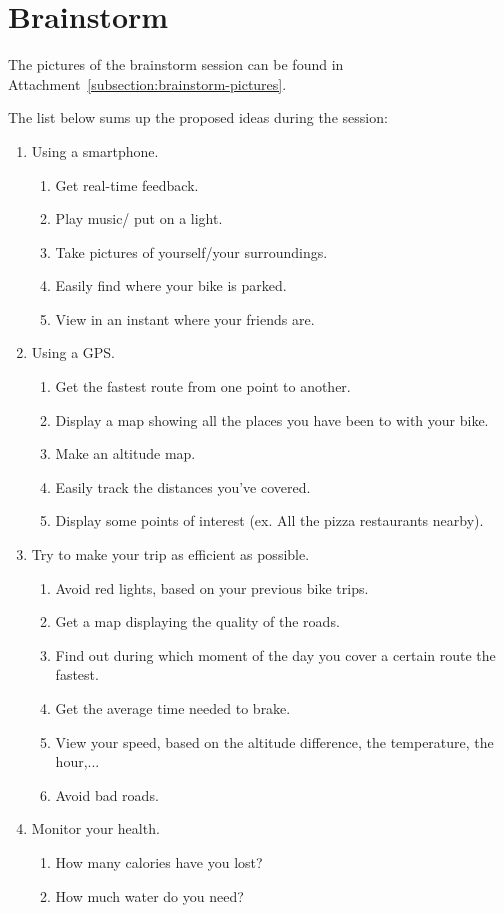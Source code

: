 \section{Brainstorm}
The pictures of the brainstorm session can be found in Attachment~\ref{subsection:brainstorm-pictures}.

The list below sums up the proposed ideas during the session:
\begin{enumerate}
 \item Using a smartphone.
 \begin{enumerate}
 \item Get real-time feedback.
 \item Play music/ put on a light.
 \item Take pictures of yourself/your surroundings.
 \item Easily find where your bike is parked.
 \item View in an instant where your friends are.
 \end{enumerate}
 \item Using a GPS.
  \begin{enumerate}
  \item Get the fastest route from one point to another.
  \item Display a map showing all the places you have been to with your bike. 
  \item Make an altitude map.
  \item Easily track the distances you've covered.
  \item Display some points of interest (ex. All the pizza restaurants nearby).
  \end{enumerate}
  \item Try to make your trip as efficient as possible.
  \begin{enumerate}
  \item Avoid red lights, based on your previous bike trips.
  \item Get a map displaying the quality of the roads.
  \item Find out during which moment of the day you cover a certain route the fastest.
  \item Get the average time needed to brake.
  \item View your speed, based on the altitude difference, the temperature, the hour,...
  \item Avoid bad roads.
  \end{enumerate}
  \item Monitor your health.
  \begin{enumerate}
   \item How many calories have you lost?
    \item How much water do you need?
  \end{enumerate}
\end{enumerate}


